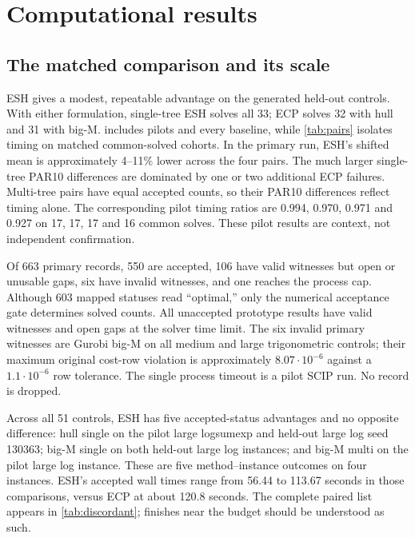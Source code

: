 \section{Computational results}\label{sec:results}
\subsection{The matched comparison and its scale}
ESH gives a modest, repeatable advantage on the generated held-out controls. With either formulation, single-tree ESH solves all 33; ECP solves 32 with hull and 31 with big-M.  includes pilots and every baseline, while \cref{tab:pairs} isolates timing on matched common-solved cohorts. In the primary run, ESH's shifted mean is approximately 4--11\% lower across the four pairs. The much larger single-tree PAR10 differences are dominated by one or two additional ECP failures. Multi-tree pairs have equal accepted counts, so their PAR10 differences reflect timing alone. The corresponding pilot timing ratios are 0.994, 0.970, 0.971 and 0.927 on 17, 17, 17 and 16 common solves. These pilot results are context, not independent confirmation.
\begin{table}[tb]
\centering\small
\caption{Accepted numerical solves on generated controls and full held-out PAR10 means (seconds). Every unaccepted result incurs 1500 seconds.}\label{tab:primary}

\end{table}
\begin{table}[tb]
\centering\small
\caption{Primary held-out timing on identical common-solved cohorts, out of 33 scheduled instances per method. Times are shifted geometric means; ratio is ESH/ECP.}\label{tab:pairs}

\end{table}

Of 663 primary records, 550 are accepted, 106 have valid witnesses but open or unusable gaps, six have invalid witnesses, and one reaches the process cap. Although 603 mapped statuses read ``optimal,'' only the numerical acceptance gate determines solved counts. All unaccepted prototype results have valid witnesses and open gaps at the solver time limit. The six invalid primary witnesses are Gurobi big-M on all medium and large trigonometric controls; their maximum original cost-row violation is approximately $8.07\cdot10^{-6}$ against a $1.1\cdot10^{-6}$ row tolerance. The single process timeout is a pilot SCIP run. No record is dropped.

Across all 51 controls, ESH has five accepted-status advantages and no opposite difference: hull single on the pilot large logsumexp and held-out large log seed 130363; big-M single on both held-out large log instances; and big-M multi on the pilot large log instance. These are five method--instance outcomes on four instances. ESH's accepted wall times range from 56.44 to 113.67 seconds in those comparisons, versus ECP at about 120.8 seconds. The complete paired list appears in \cref{tab:discordant}; finishes near the budget should be understood as such.

